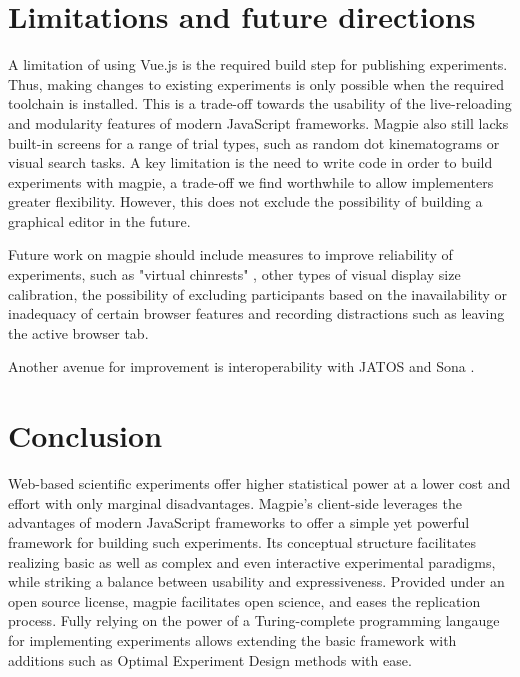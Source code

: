 \documentclass[a4paper,10pt]{paper}
\begin{document}
\section{Limitations and future directions}
A limitation of using Vue.js is the required build step for publishing experiments. Thus, making changes to existing experiments is only possible when the required toolchain is installed. This is a trade-off towards the usability of the live-reloading and modularity features of modern JavaScript frameworks. Magpie also still lacks built-in screens for a range of trial types, such as random dot kinematograms or visual search tasks. A key limitation is the need to write code in order to build experiments with magpie, a trade-off we find worthwhile to allow implementers greater flexibility. However, this does not exclude the possibility of building a graphical editor in the future.

Future work on magpie should include measures to improve reliability of experiments, such as "virtual chinrests" \citep{Li2020}, other types of visual display size calibration, the possibility of excluding participants based on the inavailability or inadequacy of certain browser features and recording distractions such as leaving the active browser tab.

Another avenue for improvement is interoperability with JATOS \citep{Lange2015} and Sona \citep{SonaSystems2002}.
\section{Conclusion}
Web-based scientific experiments offer higher statistical power at a lower cost and effort with only marginal disadvantages. Magpie's client-side leverages the advantages of modern JavaScript frameworks to offer a simple yet powerful framework for building such experiments. Its conceptual structure facilitates realizing basic as well as complex and even interactive experimental paradigms, while striking a balance between usability and expressiveness. Provided under an open source license, magpie facilitates open science, and eases the replication process. Fully relying on the power of a Turing-complete programming langauge for implementing experiments allows extending the basic framework with additions such as Optimal Experiment Design methods with ease.

\newpage 
 

\end{document}
